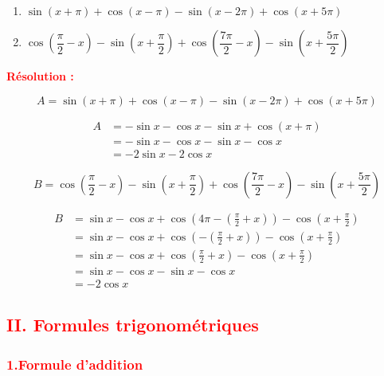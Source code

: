 \documentclass[a4paper,12pt]{article}
\begin{document}
\begin{enumerate}
    \item
          \(
          \sin(x + \pi) + \cos(x - \pi) - \sin(x - 2\pi) + \cos(x + 5\pi)
          \)

    \item
          \(
          \cos\left( \dfrac{\pi}{2} - x \right) - \sin\left( x + \dfrac{\pi}{2} \right) + \cos\left( \dfrac{7\pi}{2} - x \right) - \sin\left( x + \dfrac{5\pi}{2} \right)
          \)
\end{enumerate}

\textbf{\textcolor{red}{Résolution :}}

\[
    A = \sin(x + \pi) + \cos(x - \pi) - \sin(x - 2\pi) + \cos(x + 5\pi)
\]

\[
    \begin{aligned}
        A & = -\sin x - \cos x - \sin x + \cos(x + \pi) \\
          & = -\sin x - \cos x - \sin x - \cos x        \\
          & = -2\sin x -2\cos x
    \end{aligned}
\]

\medskip

\[
    B = \cos\left(\frac{\pi}{2} - x\right) - \sin\left(x + \frac{\pi}{2}\right) + \cos\left(\frac{7\pi}{2} - x\right) - \sin\left(x + \frac{5\pi}{2}\right)
\]

\[
    \begin{aligned}
        B & = \sin x - \cos x + \cos\left(4\pi - \left(\frac{\pi}{2} + x\right)\right) - \cos\left(x + \frac{\pi}{2}\right) \\
          & = \sin x - \cos x + \cos\left(-\left(\frac{\pi}{2} + x\right)\right) - \cos\left(x + \frac{\pi}{2}\right)       \\
          & = \sin x - \cos x + \cos\left(\frac{\pi}{2} + x\right) - \cos\left(x + \frac{\pi}{2}\right)                     \\
          & = \sin x - \cos x - \sin x - \cos x                                                                             \\
          & = -2\cos x
    \end{aligned}
\]

\subsection*{\textcolor{red}{II. Formules trigonométriques}}
\subsubsection*{\textcolor{red}{1.Formule d’addition }}
\end{document}
